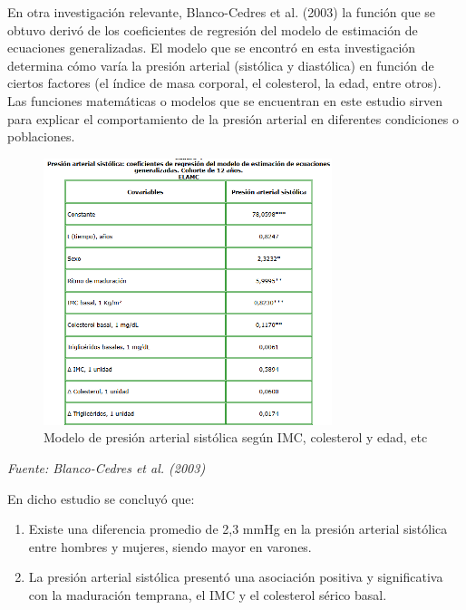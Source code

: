 \documentclass[a4paper,10pt]{article}
\begin{document}
En otra investigación relevante, Blanco-Cedres et al. (2003) la función que se obtuvo derivó de los coeficientes de regresión del modelo de estimación de ecuaciones generalizadas. El modelo que se encontró en esta investigación determina cómo varía la presión arterial (sistólica y diastólica) en función de ciertos factores (el índice de masa corporal, el colesterol, la edad, entre otros). Las funciones matemáticas o modelos que se encuentran en este estudio sirven para explicar el comportamiento de la presión arterial en diferentes condiciones o poblaciones.


\vspace{1em}
\begin{figure}[H]
    \centering
    \includegraphics[width=0.75\textwidth]{modelo_blanco_cedres.png}
    \caption{Modelo de presión arterial sistólica según IMC, colesterol y edad, etc}
    \label{fig:modelo_cedres}
\end{figure}
    
\textit {Fuente: Blanco-Cedres et al. (2003)}
\vspace{2em}

En dicho estudio se concluyó que:

\begin{enumerate}
    \item Existe una diferencia promedio de 2,3 mmHg en la presión arterial sistólica entre hombres y mujeres, siendo mayor en varones.
    \item La presión arterial sistólica presentó una asociación positiva y significativa con la maduración temprana, el IMC y el colesterol sérico basal.
\end{enumerate}
\end{document}
